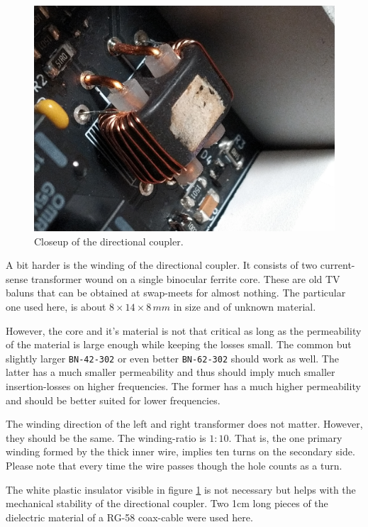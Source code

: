 \documentclass[10pt, a4paper,twoside]{scrartcl}
\begin{document}
\begin{figure}
 \includegraphics[width=\linewidth]{fig/swr.png}
 \caption{Closeup of the directional coupler.} \label{fig:swr}
\end{figure}

A bit harder is the winding of the directional coupler. It consists of two current-sense transformer wound on a single binocular ferrite core. These are old TV baluns that can be obtained at swap-meets for almost nothing. The particular one used here, is about $8 \times 14 \times 8\,mm$ in size and of unknown material. 

However, the core and it's material is not that critical as long as the permeability of the material is large enough while keeping the losses small. The common but slightly larger \texttt{BN-42-302} or even better \texttt{BN-62-302} should work as well. The latter has a much smaller permeability and thus should imply much smaller insertion-losses on higher frequencies. The former has a much higher permeability and should be better suited for lower frequencies.

The winding direction of the left and right transformer does not matter. However, they should be the same. The winding-ratio is $1 : 10$. That is, the one primary winding formed by the thick inner wire, implies ten turns on the secondary side. Please note that every time the wire passes though the hole counts as a turn.

The white plastic insulator visible in figure \ref{fig:swr} is not necessary but helps with the mechanical stability of the directional coupler. Two 1cm long pieces of the dielectric material of a RG-58 coax-cable were used here. 
\end{document}
